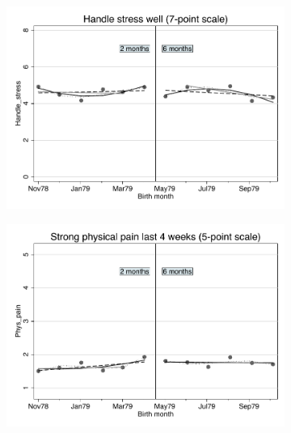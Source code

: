 \documentclass[a4paper ]{article}
\begin{document}
\begin{figure}[p]
\begin{subfigure}[h]{0.48\textwidth}\centering
	\includegraphics[width=\textwidth]{../../analysis/graphs/SOEP/Handle_stress_RD.pdf}
\end{subfigure}
\quad
\begin{subfigure}[h]{0.48\textwidth}\centering
	\includegraphics[width=\textwidth]{../../analysis/graphs/SOEP/Phys_pain_RD.pdf}
\end{subfigure}


\end{figure}
\end{document}
